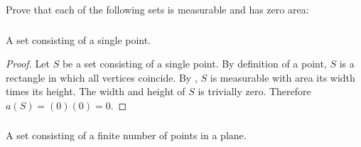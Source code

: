 \documentclass{report}
\begin{document}
Prove that each of the following sets is measurable and has zero area:

\subsubsection{}%
\label{ssub:exercise-1.7.1a}

A set consisting of a single point.

\begin{proof}

  Let $S$ be a set consisting of a single point.
  By definition of a point, $S$ is a rectangle in which all vertices coincide.
  By , $S$ is measurable with area its width
    times its height.
  The width and height of $S$ is trivially zero.
  Therefore $a(S) = (0)(0) = 0$.

\end{proof}

\subsubsection{}%
\label{ssub:exercise-1.7.1b}

A set consisting of a finite number of points in a plane.
\end{document}
